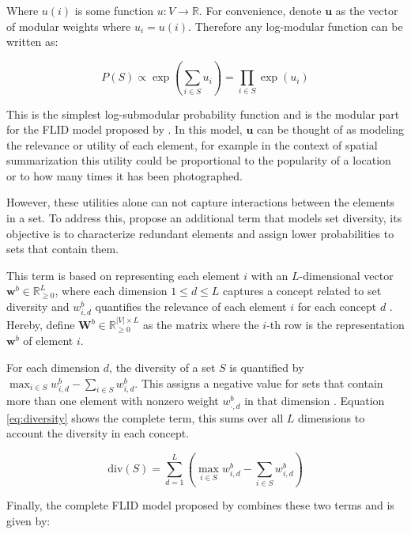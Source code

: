 Where $u(i)$ is some function $u: V \rightarrow \mathbb{R}$. For convenience, denote $\mathbf{u}$ as the vector of modular weights where $u_{i} = u(i)$. Therefore any log-modular function can be written as:

\begin{equation}
  \label{eq:modular}
  P(S) \propto \exp{\left(\sum_{i \in S}u_{i}\right)}= \prod_{i \in S} \exp{\left(u_{i}\right)}
\end{equation}

This is the simplest log-submodular probability function and is the modular part for the FLID model proposed by \citet{tschiatschek16learning}. In this model, $\mathbf{u}$ can be thought of as modeling the relevance or utility of each element, for example in the context of spatial summarization this utility could be proportional to the popularity of a location or to how many times it has been photographed.

However, these utilities alone can not capture interactions between the elements in a set. To address this, \citet{tschiatschek16learning} propose an additional term that models set diversity, its objective is to characterize redundant elements and assign lower probabilities to sets that contain them.

This term is based on representing each element $i$ with an $L$-dimensional vector $\mathbf{w}^{b} \in \mathbb{R}^{L}_{\geq 0}$, where each dimension $1 \leq d \leq L$ captures a concept related to set diversity and $w^{b}_{i,d}$ quantifies the relevance of each element $i$ for each concept $d$ \citep{tschiatschek16learning}. Hereby, define $\mathbf{W}^{b} \in \mathbb{R}^{|V| \times L}_{\geq 0}$ as the matrix where the $i$-th row is the representation $\mathbf{w}^{b}$ of element $i$.

For each dimension $d$, the diversity of a set $S$ is quantified by $\max_{i \in S}{w^{b}_{i,d}} - \sum_{i \in S}{w^{b}_{i,d}}$. This assigns a negative value for sets that contain more than one element with nonzero weight $w^{b}_{\cdot,d}$ in that dimension \citep{tschiatschek16learning}. Equation \eqref{eq:diversity} shows the complete term, this sums over all $L$ dimensions to account the diversity in each concept.

\begin{equation}
  \label{eq:diversity}
  \mathrm{div}(S) = \sum_{d=1}^{L}\left(\max_{i \in S}{w^{b}_{i, d}} - \sum_{i \in S}{w^{b}_{i,d}}\right)
\end{equation}

Finally, the complete FLID model proposed by \citet{tschiatschek16learning} combines these two terms and is given by:

